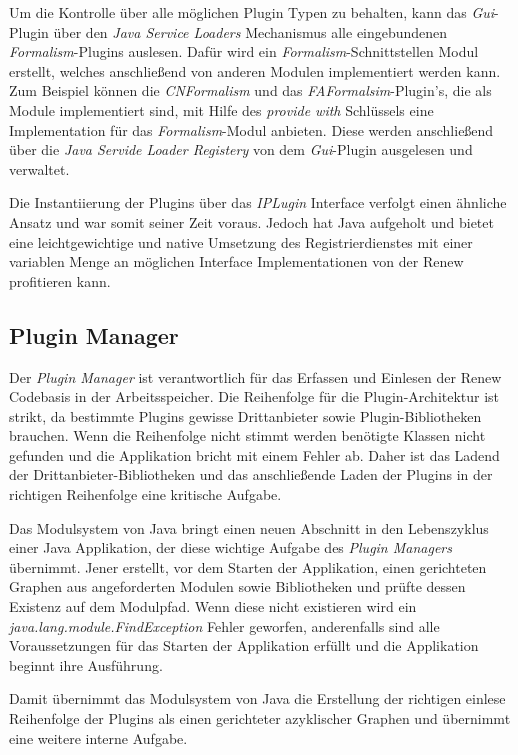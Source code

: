 Um die Kontrolle über alle möglichen Plugin Typen zu behalten, kann das \textit{Gui}-Plugin über den \textit{Java Service Loaders} Mechanismus alle eingebundenen \textit{Formalism}-Plugins auslesen. Dafür wird ein \textit{Formalism}-Schnittstellen Modul erstellt, welches anschließend von anderen Modulen implementiert werden kann. Zum Beispiel können die \textit{CNFormalism} und das \textit{FAFormalsim}-Plugin's, die als Module implementiert sind, mit Hilfe des \textit{provide with} Schlüssels eine Implementation für das \textit{Formalism}-Modul anbieten. Diese werden anschließend über die \textit{Java Servide Loader Registery} von dem \textit{Gui}-Plugin ausgelesen und verwaltet. 

\bigbreak

Die Instantiierung der Plugins über das \textit{IPLugin} Interface verfolgt einen ähnliche Ansatz und war somit seiner Zeit voraus. Jedoch hat Java aufgeholt und bietet eine leichtgewichtige und native Umsetzung des Registrierdienstes mit einer variablen Menge an möglichen Interface Implementationen von der Renew profitieren kann.   


\subsection{Plugin Manager}
Der \textit{Plugin Manager} ist verantwortlich für das Erfassen und Einlesen der Renew Codebasis in der Arbeitsspeicher. Die Reihenfolge für die Plugin-Architektur ist strikt, da bestimmte Plugins gewisse Drittanbieter sowie Plugin-Bibliotheken brauchen. Wenn die Reihenfolge nicht stimmt werden benötigte Klassen nicht gefunden und die Applikation bricht mit einem Fehler ab. Daher ist das Ladend der Drittanbieter-Bibliotheken und das anschließende Laden der Plugins in der richtigen Reihenfolge eine kritische Aufgabe. 
\bigbreak

Das Modulsystem von Java bringt einen neuen Abschnitt in den Lebenszyklus einer Java Applikation, der diese wichtige Aufgabe des \textit{Plugin Managers} übernimmt. Jener erstellt, vor dem Starten der Applikation, einen gerichteten Graphen aus angeforderten Modulen sowie Bibliotheken und prüfte dessen Existenz auf dem Modulpfad. Wenn diese nicht existieren wird ein \textit{java.lang.module.FindException} Fehler geworfen, anderenfalls sind alle Voraussetzungen für das Starten der Applikation erfüllt und die Applikation beginnt ihre Ausführung. 
\bigbreak

Damit übernimmt das Modulsystem von Java die Erstellung der richtigen einlese Reihenfolge der Plugins als einen gerichteter azyklischer Graphen und übernimmt eine weitere interne Aufgabe.
